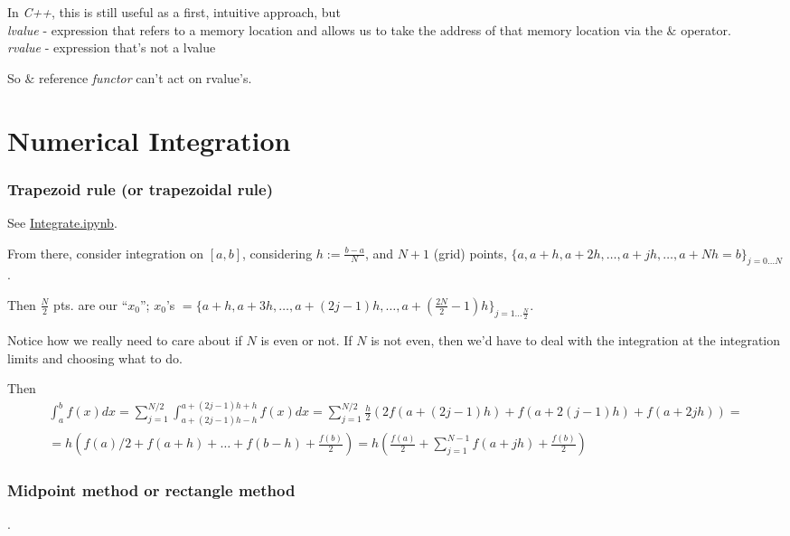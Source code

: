 \documentclass[10pt]{amsart}
\begin{document}
\begin{multicols*}{2}
\begin{lstlisting}
  \end{lstlisting}

In \emph{C++}, this is still useful as a first, intuitive approach, but \\
\emph{lvalue} - expression that refers to a memory location and allows us to take the address of that memory location via the $\&$ operator. \\
\emph{rvalue} - expression that's not a lvalue

So $\&$ reference \emph{functor} can't act on rvalue's.



\section{Numerical Integration}

\subsubsection{Trapezoid rule (or trapezoidal rule)}

See \href{https://github.com/ernestyalumni/CompPhys/blob/master/Cpp/Integrate.ipynb}{Integrate.ipynb}.

From there, consider integration on $[a,b]$, considering $h := \frac{b-a}{N}$, and $N+1$ (grid) points, $\lbrace a, a+h, a+2h, \dots , a+ jh, \dots , a+Nh = b\rbrace_{j=0 \dots N }$.

Then $\frac{N}{2}$ pts. are our ``$x_0$''; $x_0$'s $= \lbrace a +h , a+3h, \dots , a+(2j-1)h, \dots , a+ \left( \frac{2 N}{2} - 1 \right)h \rbrace_{j=1 \dots \frac{N}{2} }$.

Notice how we really need to care about if $N$ is even or not.  If $N$ is not even, then we'd have to deal with the integration at the integration limits and choosing what to do.  

Then
\[
\begin{gathered}
  \int_a^b f(x) dx = \sum_{j=1}^{N/2} \int_{a + (2j-1)h-h}^{a+(2j-1)h+h} f(x)dx = \sum_{j=1}^{N/2} \frac{h}{2} ( 2f(a+(2j-1)h ) + f(a+2(j-1)h) + f(a+2jh) ) = \\
   = h(f(a)/2 + f(a+h) + \dots + f(b-h) + \frac{f(b)}{2} ) = h \left( \frac{f(a)}{2} + \sum_{j=1}^{N-1} f(a+jh) + \frac{f(b)}{2} \right)
  \end{gathered}
\]

\subsubsection{Midpoint method or rectangle method}.


\end{multicols*}
\end{document}
